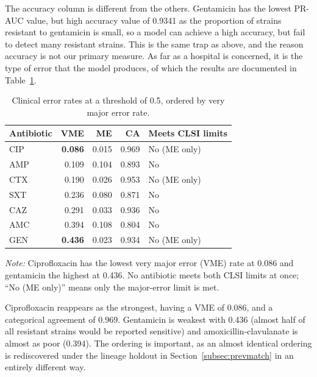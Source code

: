 The accuracy column is different from the others. Gentamicin has the lowest
PR-AUC value, but high accuracy value of 0.9341 as the proportion of strains
resistant to gentamicin is small, so a model can achieve a high accuracy, but
fail to detect many resistant strains. This is the same trap as above, and
the reason accuracy is not our primary measure. As far as a hospital is concerned, it
is the type of error that the model produces, of which the results are
documented in Table~\ref{tab:clinical}.

\FloatBarrier
\begin{table}[htb]
\centering
\caption{Clinical error rates at a threshold of 0.5, ordered by very major error
rate.}
\label{tab:clinical}
\small
\begin{tabular}{|l|r|r|r|l|}
\hline
\textbf{Antibiotic} & \textbf{VME} & \textbf{ME} & \textbf{CA} & \textbf{Meets CLSI limits} \\ \hline
CIP & \textbf{0.086} & 0.015 & 0.969 & No (ME only) \\ \hline
AMP & 0.109 & 0.104 & 0.893 & No \\ \hline
CTX & 0.190 & 0.026 & 0.953 & No (ME only) \\ \hline
SXT & 0.236 & 0.080 & 0.871 & No \\ \hline
CAZ & 0.291 & 0.033 & 0.936 & No \\ \hline
AMC & 0.394 & 0.108 & 0.804 & No \\ \hline
GEN & \textbf{0.436} & 0.023 & 0.934 & No (ME only) \\ \hline
\end{tabular}
\vspace{0.4em}

\noindent\footnotesize\textit{Note:} Ciprofloxacin has the lowest very major error (VME) rate at
0.086 and gentamicin the highest at 0.436. No antibiotic meets both CLSI limits at once;
``No (ME only)'' means only the major-error limit is met.
\end{table}

Ciprofloxacin reappears as the strongest, having a VME of 0.086, and a
categorical agreement of 0.969. Gentamicin is weakest with 0.436 (almost half
of all resistant strains would be reported sensitive) and
amoxicillin-clavulanate is almost as poor (0.394). The ordering is important,
as an almost identical ordering is rediscovered under the lineage holdout in
Section~\ref{subsec:prevmatch} in an entirely different way.

\vspace{1em}

